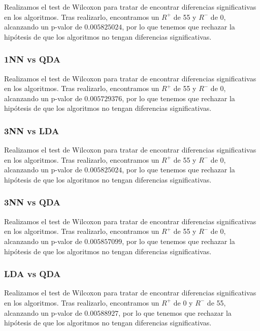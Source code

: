 Realizamos el test de Wilcoxon para tratar de encontrar diferencias significativas en los algoritmos. Tras realizarlo, encontramos un $R^{+}$ de 55 y $R^{-}$ de 0, alcanzando un p-valor de $0.005825024$, por lo que tenemos que rechazar la hipótesis de que los algoritmos no tengan diferencias significativas.

\subsubsection{1NN vs QDA}

Realizamos el test de Wilcoxon para tratar de encontrar diferencias significativas en los algoritmos. Tras realizarlo, encontramos un $R^{+}$ de 55 y $R^{-}$ de 0, alcanzando un p-valor de $0.005729376$, por lo que tenemos que rechazar la hipótesis de que los algoritmos no tengan diferencias significativas.

\subsubsection{3NN vs LDA}

Realizamos el test de Wilcoxon para tratar de encontrar diferencias significativas en los algoritmos. Tras realizarlo, encontramos un $R^{+}$ de 55 y $R^{-}$ de 0, alcanzando un p-valor de $0.005825024$, por lo que tenemos que rechazar la hipótesis de que los algoritmos no tengan diferencias significativas.

\subsubsection{3NN vs QDA}

Realizamos el test de Wilcoxon para tratar de encontrar diferencias significativas en los algoritmos. Tras realizarlo, encontramos un $R^{+}$ de 55 y $R^{-}$ de 0, alcanzando un p-valor de $0.005857099$, por lo que tenemos que rechazar la hipótesis de que los algoritmos no tengan diferencias significativas.

\subsubsection{LDA vs QDA}

Realizamos el test de Wilcoxon para tratar de encontrar diferencias significativas en los algoritmos. Tras realizarlo, encontramos un $R^{+}$ de 0 y $R^{-}$ de 55, alcanzando un p-valor de $0.00588927$, por lo que tenemos que rechazar la hipótesis de que los algoritmos no tengan diferencias significativas.

